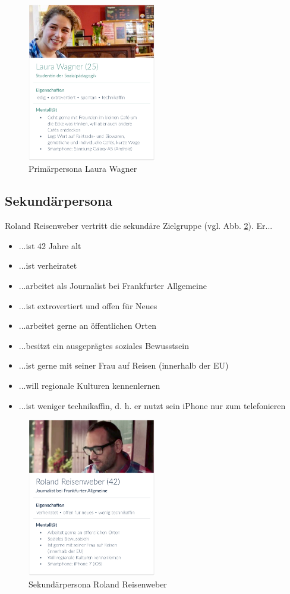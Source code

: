 \begin{figure}[h!]
    \centering
		\includegraphics[width=0.5\textwidth]{Bilder/laura.eps}
		\caption{Primärpersona Laura Wagner}
		\label{fig:laura}
\end{figure}

\subsection{Sekundärpersona}
Roland Reisenweber vertritt die sekundäre Zielgruppe (vgl. Abb. \ref{fig:roland}). Er...
\begin{itemize}
	\item ...ist 42 Jahre alt
	\item ...ist verheiratet
	\item ...arbeitet als Journalist bei Frankfurter Allgemeine
	\item ...ist extrovertiert und offen für Neues
	\item ...arbeitet gerne an öffentlichen Orten
	\item ...besitzt ein ausgeprägtes soziales Bewusstsein
	\item ...ist gerne mit seiner Frau auf Reisen (innerhalb der EU)
	\item ...will regionale Kulturen kennenlernen
	\item ...ist weniger technikaffin, d. h. er nutzt sein iPhone nur zum telefonieren
\end{itemize}

\begin{figure}[h!]
    \centering
		\includegraphics[width=0.5\textwidth]{Bilder/roland.eps}
		\caption{Sekundärpersona Roland Reisenweber}
		\label{fig:roland}
\end{figure}

